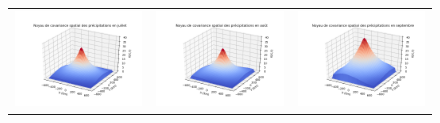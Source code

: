 \documentclass[a4paper,11pt]{article}
\numberwithin{equation}{section}
\begin{document}
\begin{figure}[H]
\begin{tabular}{ccc}
	\includegraphics[scale=0.34]{images/kernel_precip_m7.png} & \includegraphics[scale=0.34]{images/kernel_precip_m8.png} & \includegraphics[scale=0.34]{images/kernel_precip_m9.png} \\ 
\end{tabular}
\end{figure}
\end{document}

